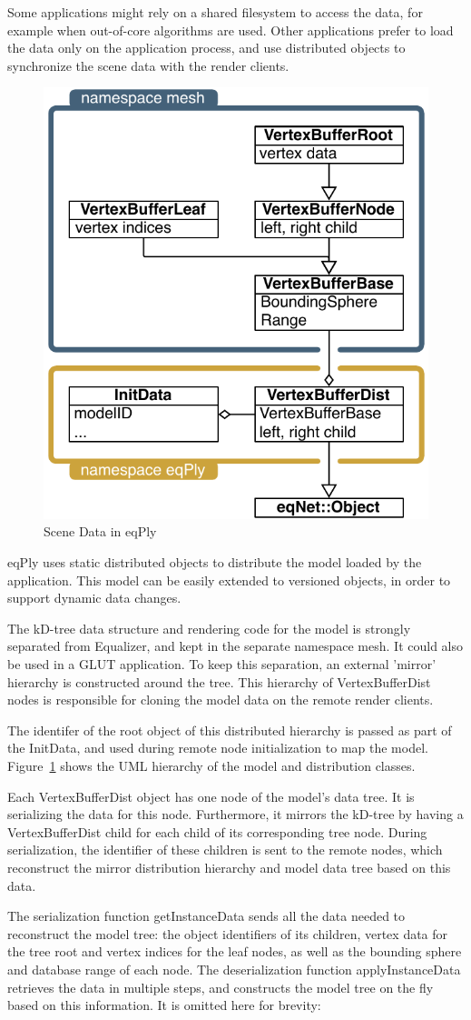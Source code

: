 \documentclass[10pt,a4]{scrartcl}
\newcommand{\fig}[1]{Figure~\ref{#1}}
\begin{document}
Some applications might rely on a shared filesystem to access the data,
for example when out-of-core algorithms are used. Other applications
prefer to load the data only on the application process, and use
distributed objects to synchronize the scene data with the render
clients.

\begin{figure}
  \includegraphics[width=.382\textwidth]{images/modelDist.pdf}
  {\caption{\small\label{fModelDist}Scene Data in eqPly}}
\end{figure}
\textsf{eqPly} uses static distributed objects to distribute the model
loaded by the application. This model can be easily extended to
versioned objects, in order to support dynamic data changes.

The kD-tree data structure and rendering code for the model is strongly
separated from Equalizer, and kept in the separate namespace
\textsf{mesh}. It could also be used in a GLUT application. To keep this
separation, an external 'mirror' hierarchy is constructed around the
tree. This hierarchy of \textsf{VertexBufferDist} nodes is responsible
for cloning the model data on the remote render clients.

The identifer of the root object of this distributed hierarchy is passed
as part of the \textsf{InitData}, and used during remote node
initialization to map the model. \fig{fModelDist} shows the UML
hierarchy of the model and distribution classes.

Each \textsf{VertexBufferDist} object has one node of the model's data
tree. It is serializing the data for this node. Furthermore, it mirrors
the kD-tree by having a \textsf{VertexBufferDist} child for each child
of its corresponding tree node. During serialization, the identifier of
these children is sent to the remote nodes, which reconstruct the mirror
distribution hierarchy and model data tree based on this data.

The serialization function \textsf{getInstanceData} sends all the data
needed to reconstruct the model tree: the object identifiers of its
children, vertex data for the tree root and vertex indices for the leaf
nodes, as well as the bounding sphere and database range of each
node. The deserialization function \textsf{applyInstanceData} retrieves
the data in multiple steps, and constructs the model tree on the fly
based on this information. It is omitted here for brevity:
\end{document}
